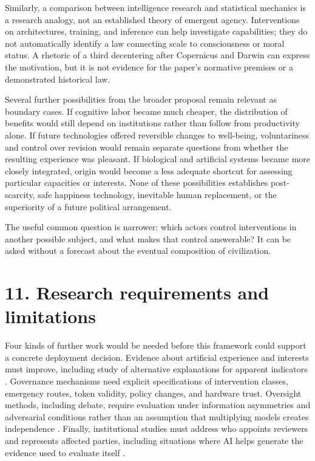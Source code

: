 \documentclass[11pt,a4paper]{article}
\begin{document}
Similarly, a comparison between intelligence research and statistical mechanics is a research analogy, not an established theory of emergent agency. Interventions on architectures, training, and inference can help investigate capabilities; they do not automatically identify a law connecting scale to consciousness or moral status. A rhetoric of a third decentering after Copernicus and Darwin can express the motivation, but it is not evidence for the paper's normative premises or a demonstrated historical law.

Several further possibilities from the broader proposal remain relevant as boundary cases. If cognitive labor became much cheaper, the distribution of benefits would still depend on institutions rather than follow from productivity alone. If future technologies offered reversible changes to well-being, voluntariness and control over revision would remain separate questions from whether the resulting experience was pleasant. If biological and artificial systems became more closely integrated, origin would become a less adequate shortcut for assessing particular capacities or interests. None of these possibilities establishes post-scarcity, safe happiness technology, inevitable human replacement, or the superiority of a future political arrangement.

The useful common question is narrower: which actors control interventions in another possible subject, and what makes that control answerable? It can be asked without a forecast about the eventual composition of civilization.

\hypertarget{section-12}{%
\section{11. Research requirements and limitations}\label{section-12}}

Four kinds of further work would be needed before this framework could support a concrete deployment decision. Evidence about artificial experience and interests must improve, including study of alternative explanations for apparent indicators \cite{ref-2} \cite{ref-3}. Governance mechanisms need explicit specifications of intervention classes, emergency routes, token validity, policy changes, and hardware trust. Oversight methods, including debate, require evaluation under information asymmetries and adversarial conditions rather than an assumption that multiplying models creates independence \cite{ref-10}. Finally, institutional studies must address who appoints reviewers and represents affected parties, including situations where AI helps generate the evidence used to evaluate itself \cite{ref-21} \cite{ref-22}.
\end{document}
